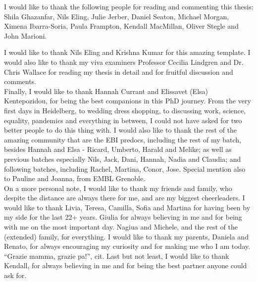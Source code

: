 \begin{acknowledgements}
I would like to thank the following people for reading and commenting this thesis: Shila Ghazanfar, Nils Eling, Julie Jerber, Daniel Seaton, Michael Morgan, Ximena Ibarra-Soria, Paula Frampton, Kendall MacMillan, Oliver Stegle and John Marioni.

I would like to thank Nils Eling and Krishna Kumar for this amazing template. 
I would also like to thank my viva examiners Professor Cecilia Lindgren and Dr. Chris Wallace for reading my thesis in detail and for fruitful discussion and comments. \\

Finally, I would like to thank Hannah Currant and Elissavet (Elsa) Kentepozidou, for being the best companions in this PhD journey.
From the very first days in Heidelberg, to wedding dress shopping, to discussing work, science, equality, pandemics and everything in between, I could not have asked for two better people to do this thing with.
I would also like to thank the rest of the amazing community that are the EBI predocs, including the rest of my batch, besides Hannah and Elsa - Ricard, Umberto, Harald and Melike; as well as previous batches especially Nils, Jack, Dani, Hannah, Nadia and Claudia; and following batches, including Rachel, Martina, Conor, Jose. 
Special mention also to Pauline and Joanna, from EMBL Grenoble. \\

On a more personal note, I would like to thank my friends and family, who despite the distance are always there for me, and are my biggest cheerleaders.
I would like to thank Livia, Teresa, Camilla, Sofia and Martina for having been by my side for the last 22+ years.
Giulia for always believing in me and for being with me on the most important day.
Nagiua and Michele, and the rest of the (extended) family, for everything.
I would like to thank my parents, Daniela and Renato, for always encouraging my curiosity and for making me who I am today.
“Grazie mamma, grazie pa!”, cit.
Last but not least, I would like to thank Kendall, for always believing in me and for being the best partner anyone could ask for.

\end{acknowledgements}
